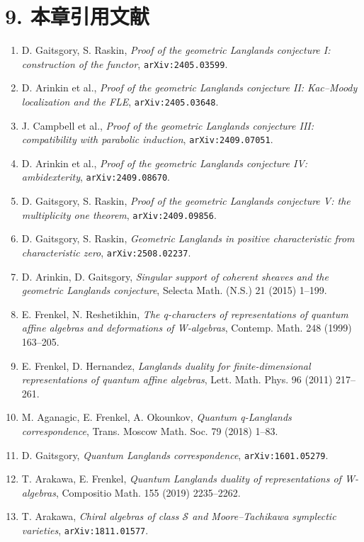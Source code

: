 \section*{9. 本章引用文献}

\begin{enumerate}
\item D. Gaitsgory, S. Raskin, \emph{Proof of the geometric Langlands conjecture I: construction of the functor}, \texttt{arXiv:2405.03599}.
\item D. Arinkin et al., \emph{Proof of the geometric Langlands conjecture II: Kac--Moody localization and the FLE}, \texttt{arXiv:2405.03648}.
\item J. Campbell et al., \emph{Proof of the geometric Langlands conjecture III: compatibility with parabolic induction}, \texttt{arXiv:2409.07051}.
\item D. Arinkin et al., \emph{Proof of the geometric Langlands conjecture IV: ambidexterity}, \texttt{arXiv:2409.08670}.
\item D. Gaitsgory, S. Raskin, \emph{Proof of the geometric Langlands conjecture V: the multiplicity one theorem}, \texttt{arXiv:2409.09856}.
\item D. Gaitsgory, S. Raskin, \emph{Geometric Langlands in positive characteristic from characteristic zero}, \texttt{arXiv:2508.02237}.
\item D. Arinkin, D. Gaitsgory, \emph{Singular support of coherent sheaves and the geometric Langlands conjecture}, Selecta Math. (N.S.) 21 (2015) 1--199.
\item E. Frenkel, N. Reshetikhin, \emph{The q-characters of representations of quantum affine algebras and deformations of W-algebras}, Contemp. Math. 248 (1999) 163--205.
\item E. Frenkel, D. Hernandez, \emph{Langlands duality for finite-dimensional representations of quantum affine algebras}, Lett. Math. Phys. 96 (2011) 217--261.
\item M. Aganagic, E. Frenkel, A. Okounkov, \emph{Quantum q-Langlands correspondence}, Trans. Moscow Math. Soc. 79 (2018) 1--83.
\item D. Gaitsgory, \emph{Quantum Langlands correspondence}, \texttt{arXiv:1601.05279}.
\item T. Arakawa, E. Frenkel, \emph{Quantum Langlands duality of representations of W-algebras}, Compositio Math. 155 (2019) 2235--2262.
\item T. Arakawa, \emph{Chiral algebras of class $\mathcal S$ and Moore--Tachikawa symplectic varieties}, \texttt{arXiv:1811.01577}.

\end{enumerate}
